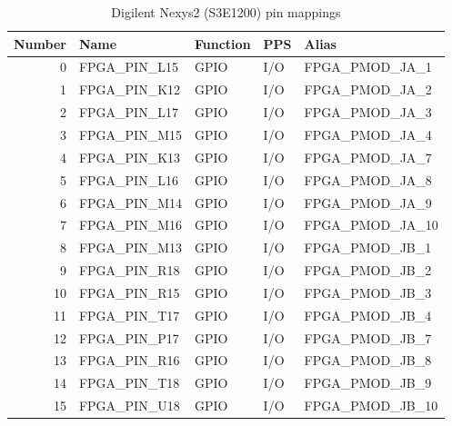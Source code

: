 \begin{table}[H]
\begin{center}
\begin{tabularx}{14cm}{rlllX}
Number & Name & Function & PPS & Alias \\
\hline


0  & FPGA\_PIN\_L15 & GPIO & I/O & FPGA\_PMOD\_JA\_1 \\
1  & FPGA\_PIN\_K12 & GPIO & I/O & FPGA\_PMOD\_JA\_2 \\
2  & FPGA\_PIN\_L17 & GPIO & I/O & FPGA\_PMOD\_JA\_3 \\
3  & FPGA\_PIN\_M15 & GPIO & I/O & FPGA\_PMOD\_JA\_4 \\
4  & FPGA\_PIN\_K13 & GPIO & I/O & FPGA\_PMOD\_JA\_7 \\
5  & FPGA\_PIN\_L16 & GPIO & I/O & FPGA\_PMOD\_JA\_8 \\
6  & FPGA\_PIN\_M14 & GPIO & I/O & FPGA\_PMOD\_JA\_9 \\
7  & FPGA\_PIN\_M16 & GPIO & I/O & FPGA\_PMOD\_JA\_10 \\
8  & FPGA\_PIN\_M13 & GPIO & I/O & FPGA\_PMOD\_JB\_1 \\
9  & FPGA\_PIN\_R18 & GPIO & I/O & FPGA\_PMOD\_JB\_2 \\
10 & FPGA\_PIN\_R15 & GPIO & I/O & FPGA\_PMOD\_JB\_3 \\
11 & FPGA\_PIN\_T17 & GPIO & I/O & FPGA\_PMOD\_JB\_4 \\
12 & FPGA\_PIN\_P17 & GPIO & I/O & FPGA\_PMOD\_JB\_7 \\
13 & FPGA\_PIN\_R16 & GPIO & I/O & FPGA\_PMOD\_JB\_8 \\
14 & FPGA\_PIN\_T18 & GPIO & I/O & FPGA\_PMOD\_JB\_9 \\
15 & FPGA\_PIN\_U18 & GPIO & I/O & FPGA\_PMOD\_JB\_10

\end{tabularx}
\caption{Digilent Nexys2 (S3E1200) pin mappings}
\end{center}
\end{table}

